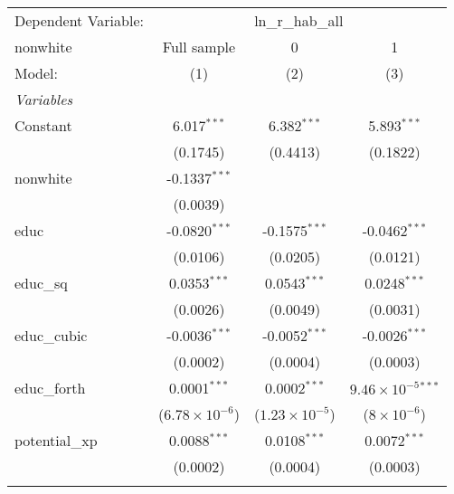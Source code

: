 \begingroup
\centering
\begin{tabular}{lccc}
   \tabularnewline \midrule \midrule
   Dependent Variable: & \multicolumn{3}{c}{ln\_r\_hab\_all}\\
   nonwhite                        & Full sample             & 0                       & 1 \\   
   Model:                          & (1)                     & (2)                     & (3)\\  
   \midrule
   \emph{Variables}\\
   Constant                        & 6.017$^{***}$           & 6.382$^{***}$           & 5.893$^{***}$\\   
                                   & (0.1745)                & (0.4413)                & (0.1822)\\   
   nonwhite                        & -0.1337$^{***}$         &                         &   \\   
                                   & (0.0039)                &                         &   \\   
   educ                            & -0.0820$^{***}$         & -0.1575$^{***}$         & -0.0462$^{***}$\\   
                                   & (0.0106)                & (0.0205)                & (0.0121)\\   
   educ\_sq                        & 0.0353$^{***}$          & 0.0543$^{***}$          & 0.0248$^{***}$\\   
                                   & (0.0026)                & (0.0049)                & (0.0031)\\   
   educ\_cubic                     & -0.0036$^{***}$         & -0.0052$^{***}$         & -0.0026$^{***}$\\   
                                   & (0.0002)                & (0.0004)                & (0.0003)\\   
   educ\_forth                     & 0.0001$^{***}$          & 0.0002$^{***}$          & $9.46\times 10^{-5}$$^{***}$\\    
                                   & ($6.78\times 10^{-6}$)  & ($1.23\times 10^{-5}$)  & ($8\times 10^{-6}$)\\    
   potential\_xp                   & 0.0088$^{***}$          & 0.0108$^{***}$          & 0.0072$^{***}$\\   
                                   & (0.0002)                & (0.0004)                & (0.0003)\\   
$$
\end{tabular}
